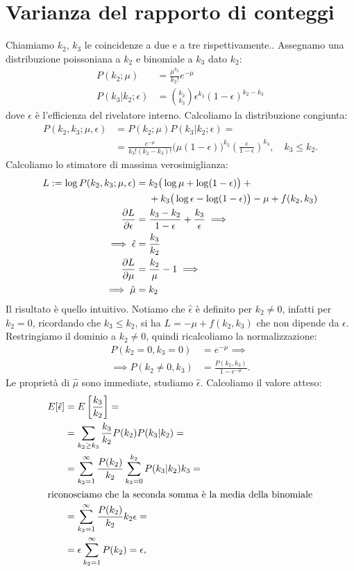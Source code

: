 \appendix
\section{Varianza del rapporto di conteggi}
\label{sec:vareff}

Chiamiamo $k_2$, $k_3$ le coincidenze a due e a tre rispettivamente..
Assegnamo una distribuzione poissoniana a $k_2$ e binomiale a $k_3$ dato $k_2$:
\begin{align*}
	P(k_2;\mu)
	&= \frac{\mu^{k_2}}{k_2!}e^{-\mu} \\
	P(k_3|k_2;\epsilon)
	&= \binom{k_2}{k_3} \epsilon^{k_3} (1-\epsilon)^{k_2-k_3}
\end{align*}
dove $\epsilon$ è l'efficienza del rivelatore interno.
Calcoliamo la distribuzione congiunta:
\begin{align*}
	P(k_2,k_3;\mu,\epsilon)
	&= P(k_2;\mu) P(k_3|k_2;\epsilon) = \\
	&= \frac{e^{-\mu}}{k_3!(k_2-k_3)!} \big(\mu(1-\epsilon)\big)^{k_2} \left(\frac\epsilon{1-\epsilon}\right)^{k_3},
	\quad k_3 \le k_2.
\end{align*}
Calcoliamo lo stimatore di massima verosimiglianza:
\begin{align*}
	L := \log P(k_2,k_3;\mu,\epsilon)
	&= k_2 \big( \log\mu + \log(1-\epsilon) \big) + {}\\
	&\phantom{{}={}}+ k_3 \big( \log\epsilon - \log(1-\epsilon) \big)
	- \mu + f(k_2,k_3) \\
	\pdv{L}{\epsilon}
	&= \frac{k_3-k_2}{1-\epsilon} + \frac{k_3}\epsilon \implies \\
	\implies \hat\epsilon
	&= \frac{k_3}{k_2} \\
	\pdv{L}{\mu}
	&= \frac{k_2}{\mu} - 1 \implies \\
	\implies \hat\mu
	&= k_2
\end{align*}
Il risultato è quello intuitivo.
Notiamo che $\hat\epsilon$ è definito per $k_2\neq 0$,
infatti per $k_2=0$, ricordando che $k_3\le k_2$, si ha
$L = -\mu + f(k_2,k_3)$ che non dipende da $\epsilon$.
Restringiamo il dominio a $k_2\neq 0$,
quindi ricalcoliamo la normalizzazione:
\begin{align*}
	P(k_2=0,k_3=0)
	&= e^{-\mu} \implies \\
	\implies P(k_2\neq 0,k_3)
	&= \frac{P(k_2,k_3)}{1-e^{-\mu}}.
\end{align*}
Le proprietà di $\hat\mu$ sono immediate,
studiamo $\hat\epsilon$.
Calcoliamo il valore atteso:
\begin{align*}
	E[\hat\epsilon]
	&= E \left[ \frac{k_3}{k_2} \right] = \\
	&= \sum_{k_2\ge k_3} \frac{k_3}{k_2} P(k_2) P(k_3|k_2) = \\
	&= \sum_{k_2=1}^\infty \frac{P(k_2)}{k_2}
	\sum_{k_3=0}^{k_2} P(k_3|k_2) k_3 = \\
	\intertext{riconosciamo che la seconda somma è la media della binomiale}
	&= \sum_{k_2=1}^\infty \frac{P(k_2)}{k_2} k_2 \epsilon = \\
	&= \epsilon \sum_{k_2=1}^\infty P(k_2)
	= \epsilon,
\end{align*}
